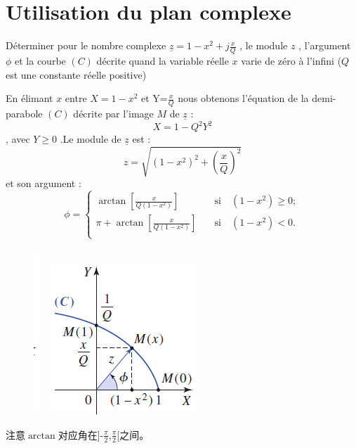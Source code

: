\documentclass[12pt]{book}
\theoremstyle{definition}\newtheorem{dfn}{Définition}[chapter]
\theoremstyle{plain}\newtheorem{thm}{Théorème}[chapter]
\theoremstyle{plain}\newtheorem{prp}{Proposition}[chapter]
\theoremstyle{plain}\newtheorem{lem}{\bf Lemme}[chapter]
\theoremstyle{plain}\newtheorem{axm}{\bf Axiome}[chapter]
\theoremstyle{plain}\newtheorem{lmm}{\bf Lemme}[chapter]
\theoremstyle{plain}\newtheorem{cor}{\bf Corollaire}[chapter]
\theoremstyle{remark}\newtheorem{rem}{Remarque}[chapter]
\begin{document}
\section{Utilisation du plan complexe}

Déterminer pour le nombre complexe $\underline{z}=1-x^2+j\frac{x}{Q}$
, le module $z$ , l'argument $\phi$ et la courbe
$(C)$ décrite quand la variable réelle $x$ varie de zéro
à l'infini ($Q$ est une constante réelle positive)

En élimant $x$ entre $X=1-x^2$ et Y=$\frac{x}{Q}$ nous
obtenons l’équation de la demi-parabole $(C)$ décrite
par l'image $M$ de $\underline{z}$ :
$$
X=1-Q^2Y^2
$$ , avec $Y\ge 0$
.Le module de $\underline{z}$ est :
$$
z=\sqrt{(1-x^2)^2+(\frac{x}{Q})^2}
$$
et son argument :
$$
\phi=\left\{
\begin{aligned}
\arctan{[\frac{x}{Q(1-x^2)}]}&\quad \text{si} \quad(1-x^2)\ge 0;\\
\pi+\arctan{[\frac{x}{Q(1-x^2)}]}&\quad \text{si} \quad (1-x^2) < 0.\\
\end{aligned}
\right.
$$

\begin{figure}[H]
	\centering
	\includegraphics[scale=1]{Regime sinusoidal force//1}
\end{figure}
注意$\arctan$对应角在]-$\frac{\pi}{2}$,$\frac{\pi}{2}$[之间。
\end{document}
